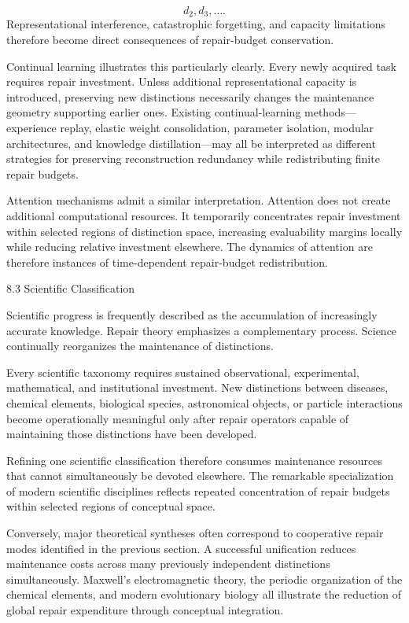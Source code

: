 \documentclass[12pt,oneside]{article}
\theoremstyle{plain}
\theoremstyle{definition}
\theoremstyle{remark}
\begin{document}
\[
d_2,d_3,\ldots.
\]
Representational interference, catastrophic forgetting, and capacity limitations therefore become direct consequences of repair-budget conservation.

Continual learning illustrates this particularly clearly. Every newly acquired task requires repair investment. Unless additional representational capacity is introduced, preserving new distinctions necessarily changes the maintenance geometry supporting earlier ones. Existing continual-learning methods—experience replay, elastic weight consolidation, parameter isolation, modular architectures, and knowledge distillation—may all be interpreted as different strategies for preserving reconstruction redundancy while redistributing finite repair budgets.

Attention mechanisms admit a similar interpretation. Attention does not create additional computational resources. It temporarily concentrates repair investment within selected regions of distinction space, increasing evaluability margins locally while reducing relative investment elsewhere. The dynamics of attention are therefore instances of time-dependent repair-budget redistribution.

8.3 Scientific Classification

Scientific progress is frequently described as the accumulation of increasingly accurate knowledge. Repair theory emphasizes a complementary process. Science continually reorganizes the maintenance of distinctions.

Every scientific taxonomy requires sustained observational, experimental, mathematical, and institutional investment. New distinctions between diseases, chemical elements, biological species, astronomical objects, or particle interactions become operationally meaningful only after repair operators capable of maintaining those distinctions have been developed.

Refining one scientific classification therefore consumes maintenance resources that cannot simultaneously be devoted elsewhere. The remarkable specialization of modern scientific disciplines reflects repeated concentration of repair budgets within selected regions of conceptual space.

Conversely, major theoretical syntheses often correspond to cooperative repair modes identified in the previous section. A successful unification reduces maintenance costs across many previously independent distinctions simultaneously. Maxwell's electromagnetic theory, the periodic organization of the chemical elements, and modern evolutionary biology all illustrate the reduction of global repair expenditure through conceptual integration.
\end{document}
